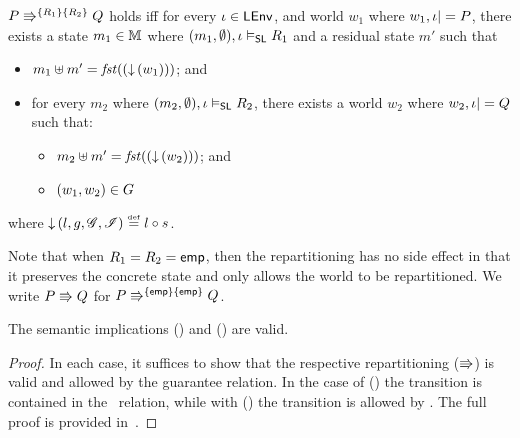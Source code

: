 \begin{definition}[Repartitioning] \label{def:repartitioning}
$\repartitions{P}{Q}{R_1}{R_2}$ holds iff for every $\lenv \in \LEnv$, and world $w_1$ where $w_1, \lenv |= P$, there exists a state $m_1 \in \Heaps$ where $(m_1, \emptyset), \lenv \slsat R_1$ and a residual state $m'$ such that 
%
\begin{itemize} 
	\item $m_1 \composeH m' = \heapPart{\left(\collapseW{w_1}\right)}$; and
	\item for every $m_2$ where $(m_2, \emptyset), \lenv \slsat R_2$, there exists a world $w_2$ where $w_2, \lenv |= Q$ such that:
	\begin{itemize}
		\item $m_2 \composeH m' = \heapPart{\left(\collapseW{w_2}\right)}$; and
		\item $(w_1, w_2) \in \guarantee$
	\end{itemize}	  
\end{itemize}
%
where $\collapseW{l, g, \gmod, \lmod} \eqdef l \composeL s$.

Note that when $R_1 = R_2 = \emp$, then the repartitioning has no side effect in that it preserves the concrete state and only allows the world to be repartitioned. We write $P \semimplies Q$ for $\repartitions{P}{Q}{\emp}{\emp} $.
%	
\end{definition}
%
%
\begin{lemma}[]
The semantic implications (\extendRule) and (\shiftRule) are valid.
%
\begin{proof}
In each case, it suffices to show that the respective repartitioning ($\semimplies$) is valid and allowed by the guarantee relation. In the case of (\extendRule) the transition is contained in the \extendG\ relation, while with (\shiftRule) the transition is allowed by \shiftG. The full proof is provided in~\cite{colosl-tr14}.
\renewcommand{\qed}{}
\end{proof}
%
\end{lemma}
%
%
